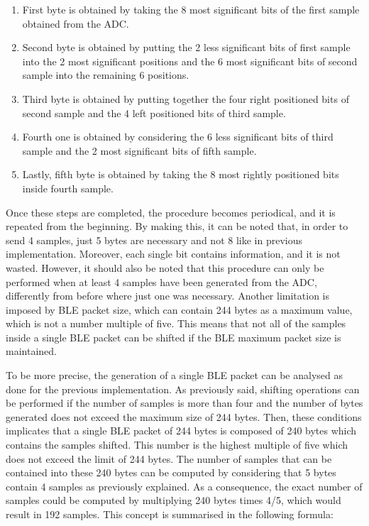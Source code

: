 \documentclass{Configuration_Files/PoliMi3i_thesis}
\begin{document}
\begin{enumerate}
    \item First byte is obtained by taking the 8 most significant bits of the first sample obtained from the ADC.
    \item Second byte is obtained by putting the 2 less significant bits of first sample into the 2 most significant positions and the 6 most significant bits of second sample into the remaining 6 positions.
    \item Third byte is obtained by putting together the four right positioned bits of second sample and the 4 left positioned bits of third sample.
    \item Fourth one is obtained by considering the 6 less significant bits of third sample and the 2 most significant bits of fifth sample.
    \item Lastly, fifth byte is obtained by taking the 8 most rightly positioned bits inside fourth sample.
\end{enumerate}

Once these steps are completed, the procedure becomes periodical, and it is repeated from the beginning. By making this, it can be noted that, in order to send 4 samples, just 5 bytes are necessary and not 8 like in previous implementation. Moreover, each single bit contains information, and it is not wasted. However, it should also be noted that this procedure can only be performed when at least 4 samples have been generated from the ADC, differently from before where just one was necessary. Another limitation is imposed by BLE packet size, which can contain 244 bytes as a maximum value, which is not a number multiple of five. This means that not all of the samples inside a single BLE packet can be shifted if the BLE maximum packet size is maintained.

To be more precise, the generation of a single BLE packet can be analysed as done for the previous implementation. As previously said, shifting operations can be performed if the number of samples is more than four and the number of bytes generated does not exceed the maximum size of 244 bytes. Then, these conditions implicates that a single BLE packet of 244 bytes is composed of 240 bytes which contains the samples shifted. This number is the highest multiple of five which does not exceed the limit of 244 bytes. The number of samples that can be contained into these 240 bytes can be computed by considering that 5 bytes contain 4 samples as previously explained. As a consequence, the exact number of samples could be computed by multiplying 240 bytes times 4/5, which would result in 192 samples. This concept is summarised in the following formula:
\end{document}
